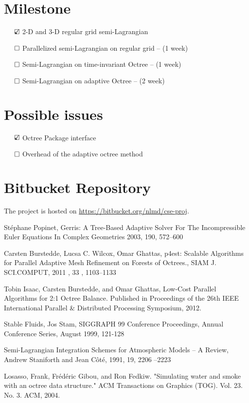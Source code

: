 \documentclass[PROP,PDF]{prop} %
\def\checkbox{\indent\text{\rlap{$\checkmark$}}\square}
\def\uncheckbox{\indent\square}
\begin{document}
\section{Milestone}
\begin{description}
\item $\checkbox$ 2-D and 3-D regular grid semi-Lagrangian
\item $\uncheckbox$ Parallelized semi-Lagrangian on regular grid -- (1 week)
\item $\uncheckbox$ Semi-Lagrangian on time-invariant Octree -- (1 week)
\item $\uncheckbox$ Semi-Lagrangian on adaptive Octree -- (2 week)
\end{description}

\section{Possible issues}
\begin{description}
\item $\checkbox$ Octree Package interface
\item $\uncheckbox$ Overhead of the adaptive octree method
\end{description}

\section{Bitbucket Repository}
The project is hosted on \href{https://bitbucket.org/nlmd/cse-proj}{https://bitbucket.org/nlmd/cse-proj}.
\begin{thebibliography}{6}

 St\'{e}phane Popinet, Gerris: A Tree-Based Adaptive Solver For The Incompressible Euler Equations In Complex Geometries 2003, 190, 572--600

 Carsten Burstedde, Lucsa C. Wilcox, Omar Ghattas,
 p4est: Scalable Algorithms for Parallel Adaptive Mesh Refinement on Forests of Octrees., SIAM J. SCI.COMPUT, 2011 , 33 , 1103--1133

 Tobin Isaac, Carsten Burstedde, and Omar Ghattas,
Low-Cost Parallel Algorithms for 2:1 Octree Balance.
Published in Proceedings of the 26th IEEE International Parallel \& Distributed Processing Symposium, 2012. 

 Stable Fluids, Jos Stam, SIGGRAPH 99 Conference Proceedings, Annual Conference Series, August 1999, 121-128

 Semi-Lagrangian Integration Schemes for Atmospheric Models -- A Review, Andrew Staniforth and Jean C\^{o}t\'{e}, 1991, 19, 2206 --2223

Losasso, Frank, Fr\'{e}d\'{e}ric Gibou, and Ron Fedkiw. "Simulating water and smoke with an octree data structure." ACM Transactions on Graphics (TOG). Vol. 23. No. 3. ACM, 2004.



\end{thebibliography}
\end{document}
